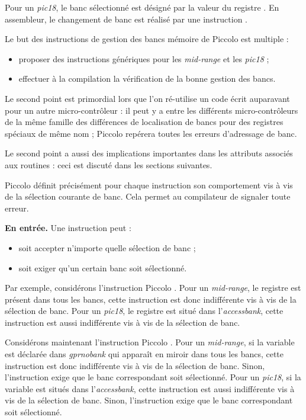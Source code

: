 Pour un \emph{pic18}, le banc sélectionné est désigné par la valeur du registre . En assembleur, le changement de banc est réalisé par une instruction .

Le but des instructions de gestion des bancs mémoire de Piccolo est multiple :
\begin{itemize}
  \item proposer des instructions génériques pour les \emph{mid-range} et les \emph{pic18} ;
  \item effectuer à la compilation la vérification de la bonne gestion des bancs.
\end{itemize}

Le second point est primordial lors que l'on ré-utilise un code écrit auparavant pour un autre micro-contrôleur : il peut y a entre les différents micro-contrôleurs de la même famille des différences de localisation de bancs pour des registres spéciaux de même nom ; Piccolo repérera toutes les erreurs d'adressage de banc.

Le second point a aussi des implications importantes dans les attributs associés aux routines : ceci est discuté dans les sections suivantes.









Piccolo définit précisément pour chaque instruction son comportement vis à vis de la sélection courante de banc. Cela permet au compilateur de signaler toute erreur.

\textbf{En entrée.} Une instruction peut :
\begin{itemize}
  \item soit accepter n'importe quelle sélection de banc ;
  \item soit exiger qu'un certain banc soit sélectionné.
\end{itemize}

Par exemple, considérons l'instruction Piccolo . Pour un \emph{mid-range}, le registre  est présent dans tous les bancs, cette instruction est donc indifférente vis à vis de la sélection de banc. Pour un \emph{pic18}, le registre  est situé dans l'\emph{accessbank}, cette instruction est aussi indifférente vis à vis de la sélection de banc. 

Considérons maintenant l'instruction Piccolo . Pour un \emph{mid-range}, si la variable  est déclarée dans \emph{gprnobank} qui apparaît en miroir dans tous les bancs, cette instruction est donc indifférente vis à vis de la sélection de banc. Sinon, l'instruction exige que le banc correspondant soit sélectionné. Pour un \emph{pic18}, si la variable  est situés dans l'\emph{accessbank}, cette instruction est aussi indifférente vis à vis de la sélection de banc.  Sinon, l'instruction exige que le banc correspondant soit sélectionné. 


